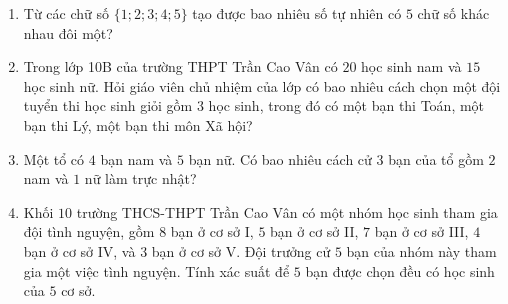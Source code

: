 \begin{bt}%
	\begin{enumerate}
		\item Từ các chữ số $\{1;2;3;4;5\}$ tạo được bao nhiêu số tự nhiên có $5$ chữ số khác nhau đôi một?
		\item Trong lớp 10B của trường THPT Trần Cao Vân có $20$ học sinh nam và $15$ học sinh nữ. Hỏi giáo viên chủ nhiệm của lớp có bao nhiêu cách chọn một đội tuyển thi học sinh giỏi gồm $3$ học sinh, trong đó có một bạn thi Toán, một bạn thi Lý, một bạn thi môn Xã hội?
		\item 	Một tổ có $4$ bạn nam và $5$ bạn nữ. Có bao nhiêu cách cử $3$ bạn của tổ gồm $2$ nam và $1$ nữ làm trực nhật?
		\item 	Khối $10$ trường THCS-THPT Trần Cao Vân có một nhóm học sinh tham gia đội tình nguyện, gồm $8$ bạn ở cơ sở I, $5$ bạn ở cơ sở II, $7$ bạn ở cơ sở III, $4$ bạn ở cơ sở IV, và $3$ bạn ở cơ sở V. Đội trưởng cử $5$ bạn của nhóm này tham gia một việc tình nguyện. Tính xác suất để $5$ bạn được chọn đều có học sinh của $5$ cơ sở. 
	\end{enumerate}
\end{bt}
